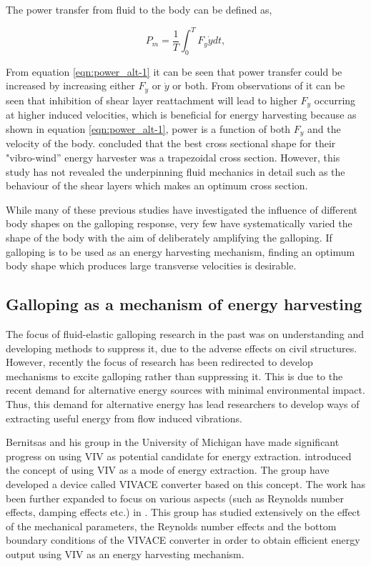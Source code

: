 The power transfer from fluid to the body can be defined as,

\begin{equation}
\label{eqn:power_alt-1}
P_{m}=\frac{1}{T}\int_{0}^{T}F_y\dot{y} dt,
\end{equation}

From equation \ref{eqn:power_alt-1} it can be seen that power transfer could be increased by increasing either $F_{y}$ or $\dot{y}$ or both. From observations of \citet{Luo1994} it can be seen that inhibition of shear layer reattachment will lead to higher $F_{y}$ occurring at higher induced velocities, which is beneficial for energy harvesting because as shown in equation \ref{eqn:power_alt-1}, power is a function of both $F_{y}$ and the velocity of the body. \citet{Kluger2013} concluded that the best cross sectional shape for their "vibro-wind'' energy harvester was a trapezoidal cross section. However, this study has not revealed the underpinning fluid mechanics in detail such as the behaviour of the shear layers which makes an optimum cross section.

While many of these previous studies have investigated the influence of different body shapes on the galloping response, very few have systematically varied the shape of the body with the aim of deliberately amplifying the galloping. If galloping is to be used as an energy harvesting mechanism, finding an optimum body shape which produces large transverse velocities is desirable.


\subsection{Galloping as a mechanism of energy harvesting}

The focus of fluid-elastic galloping research in the past was on understanding and developing methods to suppress it, due to the adverse effects on civil structures. However, recently the focus of research has been redirected to develop mechanisms to excite galloping rather than suppressing it. This is due to the recent demand for alternative energy sources with minimal environmental impact. Thus, this demand for alternative energy has lead researchers to develop ways of extracting useful energy from flow induced vibrations.

Bernitsas and his group in the University of Michigan have made significant progress on using VIV as potential candidate for energy extraction. \cite{Bernitsas2008a-concept} introduced the concept of using VIV as a mode of energy extraction. The group have developed a device called VIVACE converter based on this concept. The work has been further expanded to focus on various aspects (such as Reynolds number effects, damping effects etc.) in \citet{Bernitsas2009,Raghavan2009,Raghavan2010a,Lee2011a}. This group has studied extensively on the effect of the mechanical parameters, the Reynolds number effects and the bottom boundary conditions of the VIVACE converter in order to obtain efficient energy output using VIV as an energy harvesting mechanism. 

